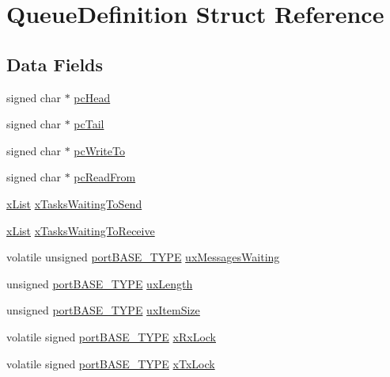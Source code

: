 \hypertarget{struct_queue_definition}{\section{Queue\-Definition Struct Reference}
\label{struct_queue_definition}
}
\subsection*{Data Fields}
\begin{DoxyCompactItemize}
\item 
signed char $\ast$ \hyperlink{struct_queue_definition_a7d7ae71baf9539e4ade463b54147197e}{pc\-Head}
\item 
signed char $\ast$ \hyperlink{struct_queue_definition_a8bc9e31a442a36c633134d81dad7ad1f}{pc\-Tail}
\item 
signed char $\ast$ \hyperlink{struct_queue_definition_a863fa84a9d1fed859baa798f3ae3edf7}{pc\-Write\-To}
\item 
signed char $\ast$ \hyperlink{struct_queue_definition_a89f93906bf3bc6a600cf2a8c08606d47}{pc\-Read\-From}
\item 
\hyperlink{list_8h_a3cee7d8d40380f66ac73b8825b5a0fb0}{x\-List} \hyperlink{struct_queue_definition_ad9e6557a628289c53f38c3bfb6f48a8a}{x\-Tasks\-Waiting\-To\-Send}
\item 
\hyperlink{list_8h_a3cee7d8d40380f66ac73b8825b5a0fb0}{x\-List} \hyperlink{struct_queue_definition_a3962c65a11b34c178604bcff6720c531}{x\-Tasks\-Waiting\-To\-Receive}
\item 
volatile unsigned \hyperlink{portmacro_8h_a1ebe82d24d764ae4e352f7c3a9f92c01}{port\-B\-A\-S\-E\-\_\-\-T\-Y\-P\-E} \hyperlink{struct_queue_definition_a4df0574070ab314745720d558e136dea}{ux\-Messages\-Waiting}
\item 
unsigned \hyperlink{portmacro_8h_a1ebe82d24d764ae4e352f7c3a9f92c01}{port\-B\-A\-S\-E\-\_\-\-T\-Y\-P\-E} \hyperlink{struct_queue_definition_a7ec3bc99d2c6f0cbac8f556927bd2890}{ux\-Length}
\item 
unsigned \hyperlink{portmacro_8h_a1ebe82d24d764ae4e352f7c3a9f92c01}{port\-B\-A\-S\-E\-\_\-\-T\-Y\-P\-E} \hyperlink{struct_queue_definition_a0380a8f6684f54b7caec84f9c4683785}{ux\-Item\-Size}
\item 
volatile signed \hyperlink{portmacro_8h_a1ebe82d24d764ae4e352f7c3a9f92c01}{port\-B\-A\-S\-E\-\_\-\-T\-Y\-P\-E} \hyperlink{struct_queue_definition_ab5e5ef7cf924973186edf123f4a9135d}{x\-Rx\-Lock}
\item 
volatile signed \hyperlink{portmacro_8h_a1ebe82d24d764ae4e352f7c3a9f92c01}{port\-B\-A\-S\-E\-\_\-\-T\-Y\-P\-E} \hyperlink{struct_queue_definition_a4e0a97a74ff0c54c4f52fada8af05562}{x\-Tx\-Lock}
\end{DoxyCompactItemize}


